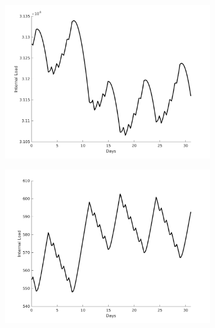 \begin{figure}[H]
\begin{subfigure}{0.45\textwidth}
\centering
\includegraphics[width=\textwidth]{jbs_figures/load_1_10}
\caption{}
\label{load_1_10}
\end{subfigure}
\centering
\begin{subfigure}{0.45\textwidth}
\includegraphics[width=\textwidth]{jbs_figures/load_2_10}
\caption{}
\label{load_2_10}
\end{subfigure} \\
\begin{subfigure}{0.45\textwidth}
\centering

\end{subfigure}
\end{figure}
